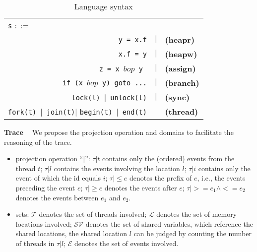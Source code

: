 
\begin{table}
	\begin{center}
		\begin{tabular}{rcl}
			\multicolumn{1}{l}{{\tt s} $::=$} & & \\
			{\tt y = x.f} & $|$ & {\bf (heapr)} \\ 
			{\tt x.f = y}  & $|$ & {\bf (heapw)} \\ %
			{\tt z = x $bop$ y}\  & $|$ & {\bf (assign)} \\ %
			{\tt if (x $bop$  y) goto ...} & $|$ &  {\bf (branch)} \\
			{\tt lock(l)}\ $|$\ {\tt unlock(l)}  & $|$& {\bf (sync)} \\
			{\tt fork(t)}\ $|$\ {\tt join(t)}$|$ {\tt begin(t)}\ $|$\ {\tt end(t)} &  & {\bf (thread)}
		\end{tabular}
	\end{center}
	\caption{\label{Ta:syntax}Language syntax}
\end{table}


{\bf Trace \ } 
We propose the projection operation and domains to facilitate the reasoning of the trace.
\begin{itemize}
\item projection operation  ``$|$'': $\tau|t$ contains only the (ordered) events from the thread $t$; $\tau|l$ contains the events involving the location $l$; $\tau|i$ contains only the event of which the id equals $i$; $\tau|\leq e$ denotes the prefix of $e$, i.e., the events preceding the event $e$; $\tau|\geq e$ denotes the events after $e$; $\tau|>=e_1\wedge <=e_2$ denotes the events between $e_1$ and $e_2$.
\item sets: $\mathcal{T}$ denotes the set of threads involved;  $\mathcal{L}$ denotes the set of memory locations involved; 
$\mathcal{SV}$ denotes the set of shared variables, which reference the shared locations, the shared location $l$ can be judged by counting the number of threads in $\tau|l$;  $\mathcal{E}$ denotes the set of events involved.
\end{itemize}







